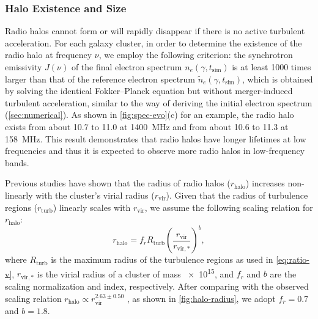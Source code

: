\documentclass[twocolumn]{aastex62}
\newcommand{\R}[1]{\mathrm{#1}}
\newcommand{\editone}[1]{{\leavevmode\color{cyan}#1}}
\begin{document}
\subsubsection{\editone{Halo Existence and Size}}
\label{sec:halo-size}

\editone{%
Radio halos cannot form or will rapidly disappear if there is no active
turbulent acceleration.
For each galaxy cluster, in order to determine the existence of the radio
halo at frequency $\nu$, we employ the following criterion:
the synchrotron emissivity $J(\nu)$ of the final electron spectrum
$n_e(\gamma, t_{\R{sim}})$ is at least \num{1000} times larger than that of
the reference electron spectrum $\tilde{n}_e(\gamma, t_{\R{sim}})$, which is
obtained by solving the identical Fokker--Planck equation but without
merger-induced turbulent acceleration, similar to the way of deriving the
initial electron spectrum (\autoref{sec:numerical}).
As shown in \autoref{fig:spec-evo}(c) for an example, the radio halo exists
from about 10.7 to 11.0 \si{\Gyr} at \SI{1400}{\MHz} and
from about 10.6 to 11.3 \si{\Gyr} at \SI{158}{\MHz}.
This result demonstrates that radio halos have longer lifetimes at low
frequencies and thus it is expected to observe more radio halos in
low-frequency bands.

Previous studies \citep[e.g.,][]{cassano2007,basu2012}
have shown that the radius of radio halos ($r_{\R{halo}}$)
increases non-linearly with the cluster's virial radius ($r_{\R{vir}}$).
Given that the radius of turbulence regions ($r_{\R{turb}}$) linearly
scales with $r_{\R{vir}}$, we assume the following scaling relation for
$r_{\R{halo}}$:
\begin{equation}
  \label{eq:r-halo}
  r_{\R{halo}} = f_r R_{\R{turb}}
    \left( \frac{r_{\R{vir}}}{r_{\R{vir,*}}} \right)^b ,
\end{equation}
where
$R_{\R{turb}}$ is the maximum radius of the turbulence regions as used in
\autoref{eq:ratio-v},
$r_{\R{vir,*}}$ is the virial radius of a cluster of mass
\SI{e15}{\solarmass},
and $f_r$ and $b$ are the scaling normalization and index, respectively.
After comparing with the observed scaling relation
$r_{\R{halo}} \propto r_{\R{vir}}^{2.63 \pm 0.50}$ \citep{cassano2007},
as shown in \autoref{fig:halo-radius},
we adopt $f_r = 0.7$ and $b = 1.8$.
} %
\end{document}
